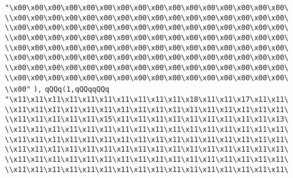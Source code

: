 \verb|"\x00\x00\x00\x00\x00\x00\x00\x00\x00\x00\x00\x00\x00\x00\x00\x00\|\newline
\verb|\\x00\x00\x00\x00\x00\x00\x00\x00\x00\x00\x00\x00\x00\x00\x00\x00\|\newline
\verb|\\x00\x00\x00\x00\x00\x00\x00\x00\x00\x00\x00\x00\x00\x00\x00\x00\|\newline
\verb|\\x00\x00\x00\x00\x00\x00\x00\x00\x00\x00\x00\x00\x00\x00\x00\x00\|\newline
\verb|\\x00\x00\x00\x00\x00\x00\x00\x00\x00\x00\x00\x00\x00\x00\x00\x00\|\newline
\verb|\\x00\x00\x00\x00\x00\x00\x00\x00\x00\x00\x00\x00\x00\x00\x00\x00\|\newline
\verb|\\x00\x00\x00\x00\x00\x00\x00\x00\x00\x00\x00\x00\x00\x00\x00\x00\|\newline
\verb|\\x00\x00\x00\x00\x00\x00\x00\x00\x00\x00\x00\x00\x00\x00\x00\x00\|\newline
\verb|\\x00"|\newline
\verb|),|\newline
\verb|qQQq(1,qQQqqQQq|\newline
\verb|"\x11\x11\x11\x11\x11\x11\x11\x11\x11\x11\x18\x11\x11\x17\x11\x11\|\newline
\verb|\\x11\x11\x11\x11\x11\x11\x11\x11\x11\x11\x11\x11\x11\x11\x11\x11\|\newline
\verb|\\x11\x11\x11\x11\x11\x15\x11\x11\x11\x11\x11\x11\x11\x11\x11\x13\|\newline
\verb|\\x11\x11\x11\x11\x11\x11\x11\x11\x11\x11\x11\x11\x11\x11\x11\x11\|\newline
\verb|\\x11\x11\x11\x11\x11\x11\x11\x11\x11\x11\x11\x11\x11\x11\x11\x11\|\newline
\verb|\\x11\x11\x11\x11\x11\x11\x11\x11\x11\x11\x11\x11\x11\x11\x11\x11\|\newline
\verb|\\x11\x11\x11\x11\x11\x11\x11\x11\x11\x11\x11\x11\x11\x11\x11\x11\|\newline
\verb|\\x11\x11\x11\x11\x11\x11\x11\x11\x11\x11\x11\x11\x11\x11\x11\x11\|\newline
